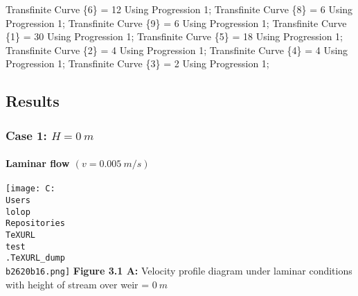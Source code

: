 \documentclass[11pt]{article}
\newenvironment{Shaded}{}{}
\newcommand{\DecValTok}[1]{\textcolor[rgb]{0.25,0.63,0.44}{{#1}}}
\newcommand{\NormalTok}[1]{{#1}}
\newcommand{\OperatorTok}[1]{\textcolor[rgb]{0.40,0.40,0.40}{{#1}}}
\begin{document}
\begin{Shaded}
\begin{Highlighting}[]
\NormalTok{Transfinite Curve }\OperatorTok{\{}\DecValTok{6}\OperatorTok{\}} \OperatorTok{=} \DecValTok{12}\NormalTok{ Using Progression }\DecValTok{1}\OperatorTok{;}
\NormalTok{Transfinite Curve }\OperatorTok{\{}\DecValTok{8}\OperatorTok{\}} \OperatorTok{=} \DecValTok{6}\NormalTok{ Using Progression }\DecValTok{1}\OperatorTok{;}
\NormalTok{Transfinite Curve }\OperatorTok{\{}\DecValTok{9}\OperatorTok{\}} \OperatorTok{=} \DecValTok{6}\NormalTok{ Using Progression }\DecValTok{1}\OperatorTok{;}
\NormalTok{Transfinite Curve }\OperatorTok{\{}\DecValTok{1}\OperatorTok{\}} \OperatorTok{=} \DecValTok{30}\NormalTok{ Using Progression }\DecValTok{1}\OperatorTok{;}
\NormalTok{Transfinite Curve }\OperatorTok{\{}\DecValTok{5}\OperatorTok{\}} \OperatorTok{=} \DecValTok{18}\NormalTok{ Using Progression }\DecValTok{1}\OperatorTok{;}
\NormalTok{Transfinite Curve }\OperatorTok{\{}\DecValTok{2}\OperatorTok{\}} \OperatorTok{=} \DecValTok{4}\NormalTok{ Using Progression }\DecValTok{1}\OperatorTok{;}
\NormalTok{Transfinite Curve }\OperatorTok{\{}\DecValTok{4}\OperatorTok{\}} \OperatorTok{=} \DecValTok{4}\NormalTok{ Using Progression }\DecValTok{1}\OperatorTok{;}
\NormalTok{Transfinite Curve }\OperatorTok{\{}\DecValTok{3}\OperatorTok{\}} \OperatorTok{=} \DecValTok{2}\NormalTok{ Using Progression }\DecValTok{1}\OperatorTok{;}
\end{Highlighting}
\end{Shaded}

\hypertarget{results}{%
\subsection{Results}\label{results}}

\hypertarget{case-1-h-0-m-1}{%
\subsubsection{\texorpdfstring{Case 1:
\(H = 0\ m\)}{Case 1: H = 0\textbackslash{} m}}\label{case-1-h-0-m-1}}

\hypertarget{laminar-flow-v-0.005-ms}{%
\paragraph{\texorpdfstring{Laminar flow
\((v = 0.005\ m/s)\)}{Laminar flow (v = 0.005\textbackslash{} m/s)}}\label{laminar-flow-v-0.005-ms}}

\texttt{[image: C:\\Users\\lolop\\Repositories\\TeXURL\\test\\.TeXURL\_dump\\b2620b16.png]} \textbf{Figure 3.1 A:}
Velocity profile diagram under laminar conditions with height of stream
over weir = \(0\ m\)
\end{document}
